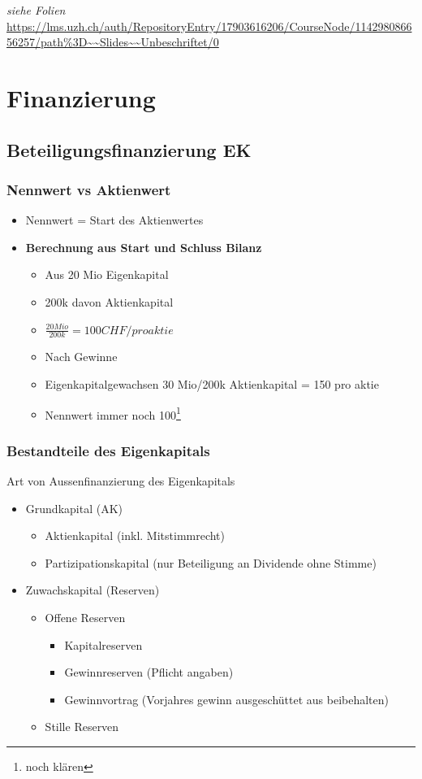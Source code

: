 \textit{siehe Folien} \url{https://lms.uzh.ch/auth/RepositoryEntry/17903616206/CourseNode/114298086656257/path%3D~~Slides~~Unbeschriftet/0} 
\section{Finanzierung}

\subsection{Beteiligungsfinanzierung EK}
\subsubsection{Nennwert vs Aktienwert}

\begin{itemize}
    \item Nennwert = Start des Aktienwertes
    \item \textbf{Berechnung aus Start und Schluss Bilanz}
    \begin{itemize}
        \item Aus 20 Mio Eigenkapital
        \item 200k davon Aktienkapital
        \item $\frac{20 Mio}{200k} = 100 CHF/proaktie$
        \item Nach Gewinne
        \item Eigenkapitalgewachsen 30 Mio/200k Aktienkapital = 150 pro aktie
        \item Nennwert immer noch 100\footnote{noch klären}
    \end{itemize}
\end{itemize}
\subsubsection{Bestandteile des Eigenkapitals}
Art von Aussenfinanzierung des Eigenkapitals
\begin{itemize}
    \item Grundkapital (AK)
    \begin{itemize}
        \item Aktienkapital (inkl. Mitstimmrecht)
        \item Partizipationskapital (nur Beteiligung an Dividende ohne Stimme)
    \end{itemize}
    \item Zuwachskapital (Reserven)
    \begin{itemize}
        \item Offene Reserven
        \begin{itemize}
            \item Kapitalreserven
            \item Gewinnreserven (Pflicht angaben)
            \item Gewinnvortrag (Vorjahres gewinn ausgeschüttet aus beibehalten)
        \end{itemize}
        \item Stille Reserven
    \end{itemize}
\end{itemize}

